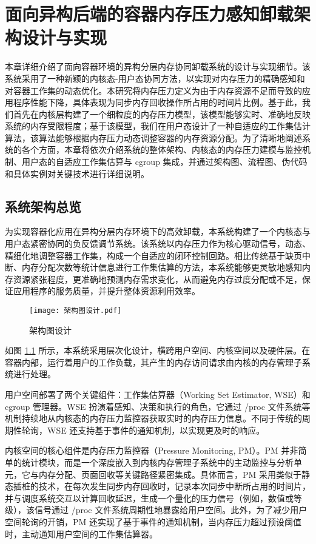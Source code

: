 \chapter{面向异构后端的容器内存压力感知卸载架构设计与实现}

本章详细介绍了面向容器环境的异构分层内存协同卸载系统的设计与实现细节。该系统采用了一种新颖的内核态-用户态协同方法，以实现对内存压力的精确感知和对容器工作集的动态优化。本研究将内存压力定义为由于内存资源不足而导致的应用程序性能下降，具体表现为同步内存回收操作所占用的时间片比例。基于此，我们首先在内核层构建了一个细粒度的内存压力模型，该模型能够实时、准确地反映系统的内存受限程度；基于该模型，我们在用户态设计了一种自适应的工作集估计算法，该算法能够根据内存压力动态调整容器的内存资源分配。为了清晰地阐述系统的各个方面，本章将依次介绍系统的整体架构、内核态的内存压力建模与监控机制、用户态的自适应工作集估算与 cgroup 集成，并通过架构图、流程图、伪代码和具体实例对关键技术进行详细说明。

\section{系统架构总览}

为实现容器化应用在异构分层内存环境下的高效卸载，本系统构建了一个内核态与用户态紧密协同的负反馈调节系统。该系统以内存压力作为核心驱动信号，动态、精细化地调整容器工作集，构成一个自适应的闭环控制回路。相比传统基于缺页中断、内存分配次数等统计信息进行工作集估算的方法，本系统能够更灵敏地感知内存资源紧张程度，更准确地预测内存需求变化，从而避免内存过度分配或不足，保证应用程序的服务质量，并提升整体资源利用效率。

\begin{figure}[h]
    \texttt{[image: 架构图设计.pdf]}
    \caption{架构图设计}
    \label{架构图设计}
\end{figure}

如图 \ref{架构图设计} 所示，本系统采用层次化设计，横跨用户空间、内核空间以及硬件层。在容器内部，运行着用户的工作负载，其产生的内存访问请求由内核的内存管理子系统进行处理。

用户空间部署了两个关键组件：工作集估算器（Working Set Estimator, WSE）和 cgroup 管理器。WSE 扮演着感知、决策和执行的角色，它通过 /proc 文件系统等机制持续地从内核态的内存压力监控器获取实时的内存压力信息。不同于传统的周期性轮询，WSE 还支持基于事件的通知机制，以实现更及时的响应。

内核空间的核心组件是内存压力监控器（Pressure Monitoring, PM）。PM 并非简单的统计模块，而是一个深度嵌入到内核内存管理子系统中的主动监控与分析单元，它与内存分配、页面回收等关键路径紧密集成。具体而言，PM 采用类似于静态插桩的技术，在每次发生同步内存回收时，记录本次同步中断所占用的时间片，并与调度系统交互以计算回收延迟，生成一个量化的压力信号（例如，数值或等级），该信号通过 /proc 文件系统周期性地暴露给用户空间。此外，为了减少用户空间轮询的开销，PM 还实现了基于事件的通知机制，当内存压力超过预设阈值时，主动通知用户空间的工作集估算器。

